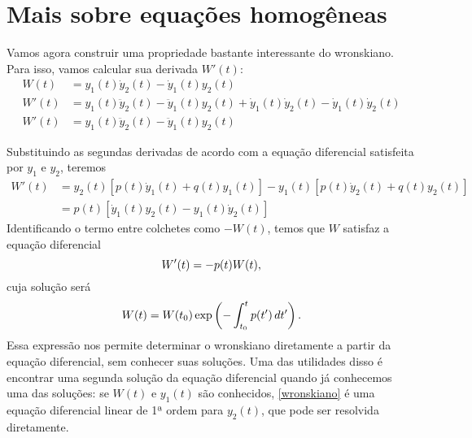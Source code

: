 \documentclass[12pt,a4paper,oneside]{memoir}
\begin{document}

\section{Mais sobre equações homogêneas}

Vamos agora construir uma propriedade bastante interessante do wronskiano.  Para isso, vamos calcular sua derivada $W'(t)$:
\begin{align}
\label{wronskiano}
  W(t) &=
    y_1(t) \dot{y}_2(t) - \dot{y}_1(t) y_2(t) \\
  W'(t) &=
    y_1(t) \ddot{y}_2(t) - \ddot{y}_1(t) y_2(t) +
    \dot{y}_1(t) \dot{y}_2(t) - \dot{y}_1(t) \dot{y}_2(t) \nonumber\\
  W'(t) &=
    y_1(t) \ddot{y}_2(t) - \ddot{y}_1(t) y_2(t)
\end{align}

Substituindo as segundas derivadas de acordo com a equação diferencial satisfeita por $y_1$ e $y_2$, teremos
\begin{align*}
  W'(t) &=
    y_2(t) [p(t) \dot{y}_1(t) + q(t) y_1(t)] - y_1(t) [p(t) \dot{y}_2(t) + q(t) y_2(t)] \\
  &=
    p(t) \left[ \dot{y}_1(t) y_2(t) - y_1(t) \dot{y}_2(t) \right]
\end{align*}
Identificando o termo entre colchetes como $-W(t)$, temos que $W$ satisfaz a equação diferencial
\begin{equation}
  W'(t) = -p(t) W(t) \text,
\end{equation}
cuja solução será
\begin{equation}
  W(t) = W(t_0) \exp \left( -\int_{t_0}^{t} p(t')\,dt' \right) \text.
\end{equation}
%
Essa expressão nos permite determinar o wronskiano diretamente a partir da equação diferencial, sem conhecer suas soluções.  Uma das utilidades disso é encontrar uma segunda solução da equação diferencial quando já conhecemos uma das soluções:  se $W(t)$ e $y_1(t)$ são conhecidos, \eqref{wronskiano} é uma equação diferencial linear de 1ª ordem para $y_2(t)$, que pode ser resolvida diretamente.




\end{document}
